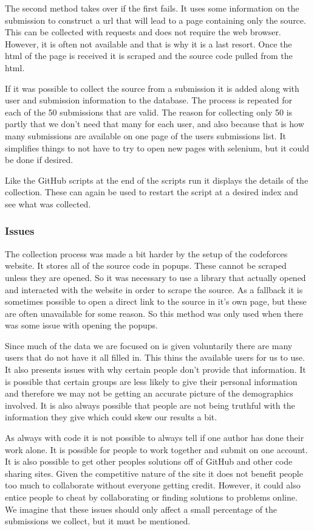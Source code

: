 \documentclass{article}
\begin{document}
The second method takes over if the first fails. It uses some information on the submission to construct a url that will lead to a page containing only the source. This can be collected with requests and does not require the web browser. However, it is often not available and that is why it is a last resort. Once the html  of the page is received it is scraped and the source code pulled from the html.

If it was possible to collect the source from a submission it is added along with user and submission information to the database. The process is repeated for each of the 50 submissions that are valid. The reason for collecting only 50 is partly that we don't need that many for each user, and also because that is how many submissions are available on one page of the users submissions list. It simplifies things to not have to try to open new pages with selenium, but it could be done if desired.

Like the GitHub scripts at the end of the scripts run it displays the details of the collection. These can again be used to restart the script at a desired index and see what was collected.

\subsubsection{Issues}
The collection process was made a bit harder by the setup of the codeforces website. It stores all of the source code in popups. These cannot be scraped unless they are opened. So it was necessary to use a library that actually opened and interacted with the website in order to scrape the source. As a fallback it is sometimes possible to open a direct link to the source in it's own page, but these are often unavailable for some reason. So this method was only used when there was some issue with opening the popups.

Since much of the data we are focused on is given voluntarily there are many users that do not have it all filled in. This thins the available users for us to use. It also presents issues with why certain people don't provide that information. It is possible that certain groups are less likely to give their personal information and therefore we may not be getting an accurate picture of the demographics involved. It is also always possible that people are not being truthful with the information they give which could skew our results a bit.

As always with code it is not possible to always tell if one author has done their work alone. It is possible for people to work together and submit on one account. It is also possible to get other peoples solutions off of GitHub and other code sharing sites. Given the competitive nature of the site it does not benefit people too much to collaborate without everyone getting credit. However, it could also entice people to cheat by collaborating or finding solutions to problems online. We imagine that these issues should only affect a small percentage of the submissions we collect, but it must be mentioned.
\end{document}
